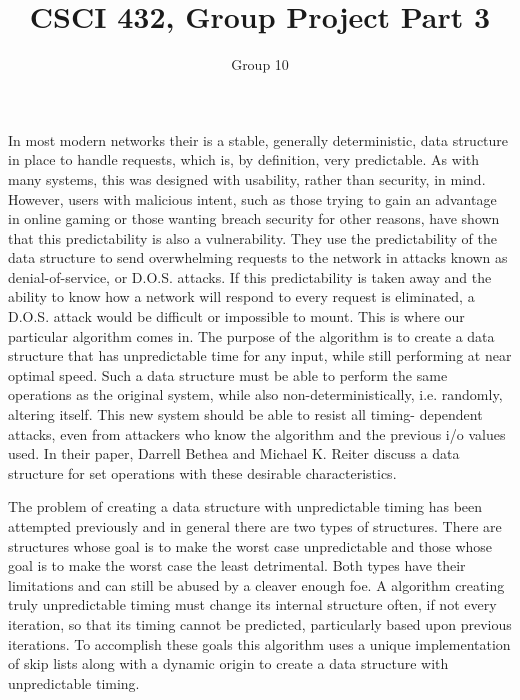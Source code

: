 \documentclass[10pt]{article}
\title{CSCI 432, Group Project Part 3}
\author{Group 10}
\begin{document}
\maketitle


	In most modern networks their is a stable, generally deterministic, data
structure in place to handle requests, which is, by definition, very predictable. As with many systems, this was designed with usability, rather than security, in mind. However, users with malicious intent, such as those trying to gain an advantage in online gaming or those wanting breach security for other reasons, have shown that this predictability is also a vulnerability. They use the predictability of the data structure to send overwhelming requests to the network in attacks known as denial-of-service, or D.O.S. attacks. If this predictability is taken away and the ability to know how a network will respond to every request is eliminated, a D.O.S. attack would be difficult or impossible to mount. This is where our particular algorithm comes in. The purpose of the algorithm is to create a data structure that has unpredictable time for any input, while still performing at near optimal speed. Such a data structure must be able to perform the same operations as 
the original system, while also non-deterministically, i.e. randomly, 
altering itself. This new system should be able to resist all timing-
dependent attacks,
even from attackers who know the algorithm and the previous i/o values used.
In their paper, Darrell Bethea and Michael K. Reiter discuss a data
structure for set operations with these desirable characteristics\cite{Bethea09}.


	The problem of creating a data structure with unpredictable timing has been 
attempted previously and in general there are two types of structures.
There are structures whose goal is to make the worst case unpredictable and 
those whose goal is to make the worst case the least detrimental. Both types 
have their limitations and can still be abused by a cleaver enough foe.
A algorithm creating truly unpredictable timing must change its internal 
structure often, if not every iteration, so that its timing cannot be predicted, particularly based upon previous iterations. 
To accomplish these goals this algorithm uses a unique implementation of skip 
lists along with a dynamic origin to create a data structure with unpredictable timing.
\end{document}
